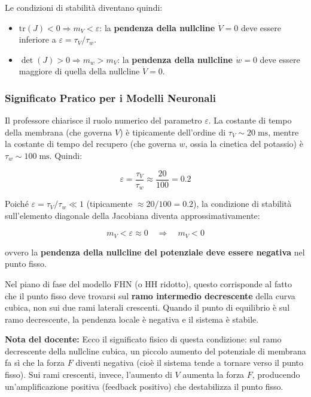 Le condizioni di stabilità diventano quindi:

\begin{itemize}
    \item $\text{tr}(J) < 0 \Rightarrow m_V < \varepsilon$: la \textbf{pendenza della nullcline $\dot{V}=0$} deve essere inferiore a $\varepsilon = \tau_V/\tau_w$.
    \item $\det(J) > 0 \Rightarrow m_w > m_V$: la \textbf{pendenza della nullcline $\dot{w}=0$} deve essere maggiore di quella della nullcline $\dot{V}=0$.
\end{itemize}

\subsubsection{Significato Pratico per i Modelli Neuronali}

Il professore chiarisce il ruolo numerico del parametro $\varepsilon$. La costante di tempo della membrana (che governa $V$) è tipicamente dell'ordine di $\tau_V \sim 20 \; \text{ms}$, mentre la costante di tempo del recupero (che governa $w$, ossia la cinetica del potassio) è $\tau_w \sim 100 \; \text{ms}$. Quindi:

\begin{equation}
\varepsilon = \frac{\tau_V}{\tau_w} \approx \frac{20}{100} = 0.2
\end{equation}

Poiché $\varepsilon = \tau_V/\tau_w \ll 1$ (tipicamente $\approx 20/100 = 0.2$), la condizione di stabilità sull'elemento diagonale della Jacobiana diventa approssimativamente:

\begin{equation}
m_V < \varepsilon \approx 0 \quad \Rightarrow \quad m_V < 0
\end{equation}

ovvero la \textbf{pendenza della nullcline del potenziale deve essere negativa} nel punto fisso.

Nel piano di fase del modello FHN (o HH ridotto), questo corrisponde al fatto che il punto fisso deve trovarsi sul \textbf{ramo intermedio decrescente} della curva cubica, non sui due rami laterali crescenti. Quando il punto di equilibrio è sul ramo decrescente, la pendenza locale è negativa e il sistema è stabile.

\begin{tcolorbox}[colback=gray!5, colframe=gray!40, arc=2mm, boxrule=0.5pt]
\textbf{Nota del docente:} Ecco il significato fisico di questa condizione: sul ramo decrescente della nullcline cubica, un piccolo aumento del potenziale di membrana fa sì che la forza $F$ diventi negativa (cioè il sistema tende a tornare verso il punto fisso). Sui rami crescenti, invece, l'aumento di $V$ aumenta la forza $F$, producendo un'amplificazione positiva (feedback positivo) che destabilizza il punto fisso.
\end{tcolorbox}



